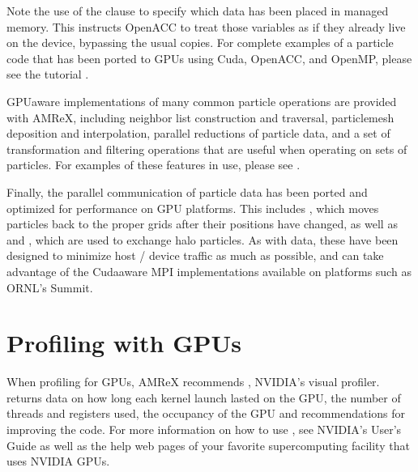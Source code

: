 \documentclass[letterpaper,10pt,english]{sphinxmanual}
\begin{document}
\sphinxAtStartPar
Note the use of the  clause to specify which data has been placed
in managed memory. This instructs OpenACC to treat those variables as if they already live on
the device, bypassing the usual copies. For complete examples of a particle code that has been ported
to GPUs using Cuda, OpenACC, and OpenMP, please see the tutorial .

\sphinxAtStartPar
GPU\sphinxhyphen{}aware implementations of many common particle operations are provided with AMReX, including neighbor list
construction and traversal, particle\sphinxhyphen{}mesh deposition and interpolation, parallel reductions of particle data,
and a set of transformation and filtering operations that are useful when operating on sets of particles. For
examples of these features in use, please see .

\sphinxAtStartPar
Finally, the parallel communication of particle data has been ported and optimized for performance on GPU
platforms. This includes , which moves particles back to the proper grids after their positions
have changed, as well as  and , which are used to exchange halo particles.
As with  data, these have been designed to minimize host / device traffic as much as possible, and can
take advantage of the Cuda\sphinxhyphen{}aware MPI implementations available on platforms such as ORNL’s Summit.


\section{Profiling with GPUs}
\label{\detokenize{GPU:profiling-with-gpus}}\label{\detokenize{GPU:sec-gpu-profiling}}
\sphinxAtStartPar
When profiling for GPUs, AMReX recommends , NVIDIA’s visual
profiler.   returns data on how long each kernel launch lasted on
the GPU, the number of threads and registers used, the occupancy of the GPU
and recommendations for improving the code.  For more information on how to
use , see NVIDIA’s User’s Guide as well as the help web pages of
your favorite supercomputing facility that uses NVIDIA GPUs.
\end{document}
